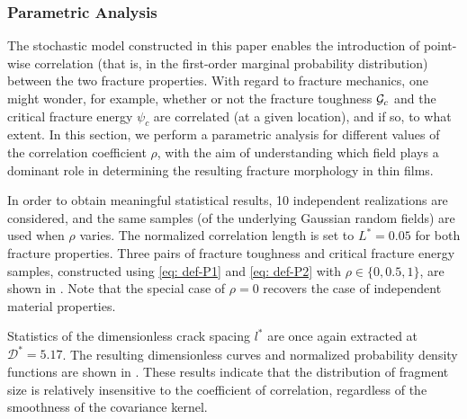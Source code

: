 \subsubsection{Parametric Analysis}

The stochastic model constructed in this paper enables the introduction of point-wise correlation (that is, in the first-order marginal probability distribution) between the two fracture properties.
With regard to fracture mechanics, one might wonder, for example, whether or not the fracture toughness ${\mathcal{G}_c}$ and the critical fracture energy $\psi_c$ are correlated (at a given location), and if so, to what extent. In this section, we perform a parametric analysis for different values of the correlation coefficient $\rho$, with the aim of understanding which field plays a dominant role in determining the resulting fracture morphology in thin films.

In order to obtain meaningful statistical results, 10 independent realizations are considered, and the same samples (of the underlying Gaussian random fields) are used when $\rho$ varies. The normalized correlation length is set to $L^* = 0.05$ for both fracture properties.
Three pairs of fracture toughness and critical fracture energy samples, constructed using \eqref{eq: def-P1} and \eqref{eq: def-P2} with $\rho \in \{0, 0.5, 1\}$, are shown in . Note that the special case of $\rho = 0$ recovers the case of independent material properties.



Statistics of the dimensionless crack spacing $l^*$ are once again extracted at $\mathcal{D}^* = 5.17$. The resulting dimensionless curves and normalized probability density functions are shown in . These results indicate that the distribution of fragment size is relatively insensitive to the coefficient of correlation, regardless of the smoothness of the covariance kernel.

